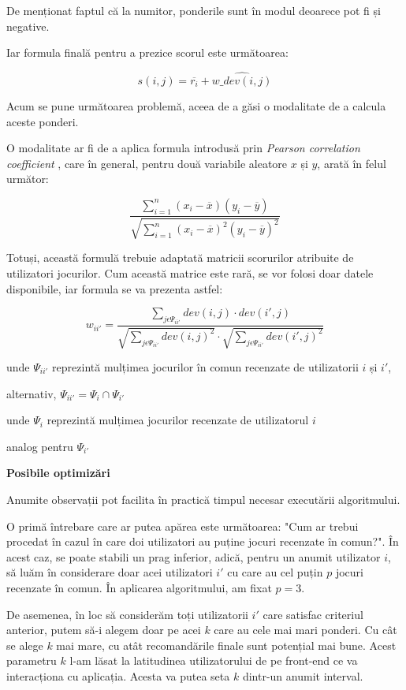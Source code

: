 \documentclass[12pt,a4paper]{report}
\begin{document}
De menționat faptul că la numitor, ponderile sunt în modul deoarece pot fi și negative.

\bigskip

Iar formula finală pentru a prezice scorul este următoarea:

\[  s(i,j) = \overline{r_i} + \hat{w\_dev(i,j)}  \]

Acum se pune următoarea problemă, aceea de a găsi o modalitate de a calcula aceste ponderi.

O modalitate ar fi de a aplica formula introdusă prin \emph{Pearson correlation coefficient} \cite{30}
, care în general, pentru două variabile aleatore \( x \) și \( y \), arată în felul următor: 

\[ \frac{{}\sum_{i=1}^{n} (x_i - \overline{x})(y_i - \overline{y})}
{\sqrt{\sum_{i=1}^{n} (x_i - \overline{x})^2(y_i - \overline{y})^2}} \]

Totuși, această formulă trebuie adaptată matricii scorurilor atribuite de utilizatori jocurilor. Cum această matrice este rară, se vor folosi doar datele disponibile, iar formula se va prezenta astfel:

\[ w_{ii'} = \dfrac{ \sum\limits_{j \epsilon \Psi_{ii'} } dev(i, j) \cdot dev(i', j) }{
\sqrt{\sum\limits_{j \epsilon \Psi_{ii'} } dev(i, j)^2} \cdot \sqrt{\sum\limits_{j \epsilon \Psi_{ii'} } dev(i', j)^2} }\]

unde \( \Psi_{ii'}\) reprezintă mulțimea jocurilor în comun recenzate de utilizatorii \( i \) și \( i' \),

alternativ,
\( \Psi_{ii'} = \Psi_{i} \cap \Psi_{i'}  \)

unde \( \Psi_{i} \) reprezintă mulțimea jocurilor recenzate de utilizatorul \( i \)

analog pentru \( \Psi_{i'} \)

\bigskip
\textbf{Posibile optimizări}
\bigskip

Anumite observații pot facilita în practică timpul necesar executării algoritmului.

O primă întrebare care ar putea apărea este următoarea: "Cum ar trebui procedat în cazul în care doi utilizatori au puține jocuri recenzate în comun?". În acest caz, se poate stabili un prag inferior, adică, pentru un anumit utilizator \( i \), să luăm în considerare doar acei utilizatori \( i' \) cu care au cel puțin \( p \) jocuri recenzate în comun. În aplicarea algoritmului, am fixat \( p = 3 \).

De asemenea, în loc să considerăm toți utilizatorii \( i' \) care satisfac criteriul anterior, putem să-i alegem doar pe acei \( k \) care au cele mai mari ponderi. Cu cât se alege \( k \) mai mare, cu atât recomandările finale sunt potențial mai bune. Acest parametru \( k \) l-am lăsat la latitudinea utilizatorului de pe front-end ce va interacționa cu aplicația. Acesta va putea seta \( k \) dintr-un anumit interval.
\end{document}
